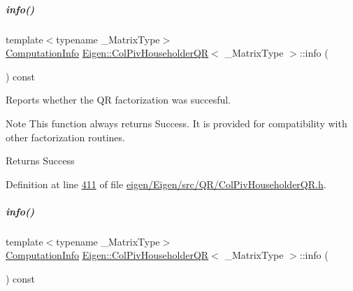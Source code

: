 \mbox{\label{group___q_r___module_a5c756a789175197cab3eff3a3e479ef2}} 
\subparagraph{\texorpdfstring{info()}{info()}\hspace{0.1cm}{\footnotesize\ttfamily [1/2]}}
{\footnotesize\ttfamily template$<$typename \+\_\+\+Matrix\+Type$>$ \\
\hyperlink{group__enums_ga85fad7b87587764e5cf6b513a9e0ee5e}{Computation\+Info} \hyperlink{group___q_r___module_class_eigen_1_1_col_piv_householder_q_r}{Eigen\+::\+Col\+Piv\+Householder\+QR}$<$ \+\_\+\+Matrix\+Type $>$\+::info (\begin{DoxyParamCaption}{ }\end{DoxyParamCaption}) const\hspace{0.3cm}{\ttfamily [inline]}}



Reports whether the QR factorization was succesful. 

\begin{DoxyNote}{Note}
This function always returns {\ttfamily Success}. It is provided for compatibility with other factorization routines. 
\end{DoxyNote}
\begin{DoxyReturn}{Returns}
{\ttfamily Success} 
\end{DoxyReturn}


Definition at line \hyperlink{eigen_2_eigen_2src_2_q_r_2_col_piv_householder_q_r_8h_source_l00411}{411} of file \hyperlink{eigen_2_eigen_2src_2_q_r_2_col_piv_householder_q_r_8h_source}{eigen/\+Eigen/src/\+Q\+R/\+Col\+Piv\+Householder\+Q\+R.\+h}.

\mbox{\label{group___q_r___module_a5c756a789175197cab3eff3a3e479ef2}} 
\subparagraph{\texorpdfstring{info()}{info()}\hspace{0.1cm}{\footnotesize\ttfamily [2/2]}}
{\footnotesize\ttfamily template$<$typename \+\_\+\+Matrix\+Type$>$ \\
\hyperlink{group__enums_ga85fad7b87587764e5cf6b513a9e0ee5e}{Computation\+Info} \hyperlink{group___q_r___module_class_eigen_1_1_col_piv_householder_q_r}{Eigen\+::\+Col\+Piv\+Householder\+QR}$<$ \+\_\+\+Matrix\+Type $>$\+::info (\begin{DoxyParamCaption}{ }\end{DoxyParamCaption}) const\hspace{0.3cm}{\ttfamily [inline]}}



